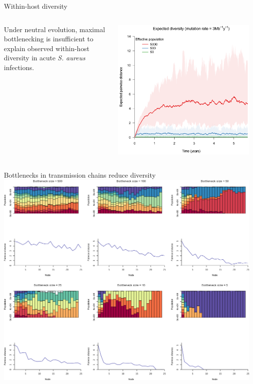 \documentclass{beamer}
\begin{document}
\begin{frame}{Within-host diversity}
    \begin{columns}
        \begin{column}{0.4\textwidth}
            Under neutral evolution, maximal bottlenecking is insufficient to
            explain observed within-host diversity in acute \textit{S. aureus}
            infections.
        \end{column}
        \begin{column}{0.6\textwidth}
            \includegraphics[width=\textwidth]{f1}
        \end{column}
    \end{columns}
\end{frame}

\begin{frame}{Bottlenecks in transmission chains reduce diversity}
    \includegraphics[trim=0 2in 0 0, clip=true, width=\textwidth]{fs3}
\end{frame}
\end{document}
